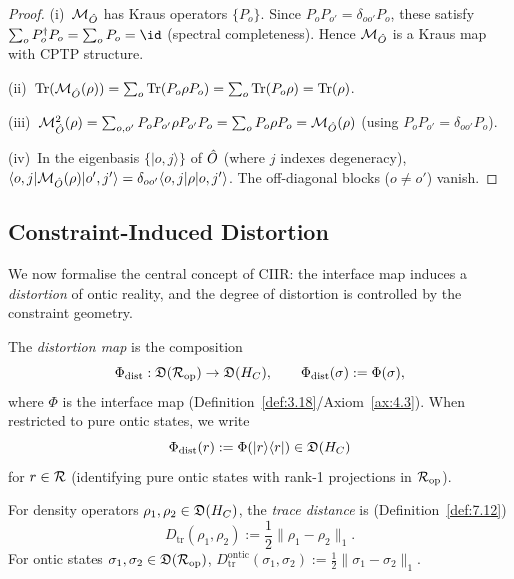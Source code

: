 \begin{proof}
(i)~$\mathcal{M}_{\hat{O}}$ has Kraus operators $\{P_o\}$.  Since
$P_o P_{o'} = \delta_{oo'} P_o$, these satisfy $\sum_o P_o^\dagger
P_o = \sum_o P_o = \id$ (spectral completeness).  Hence
$\mathcal{M}_{\hat{O}}$ is a Kraus map with CPTP structure.

(ii)~$\mathrm{Tr}(\mathcal{M}_{\hat{O}}(\rho)) = \sum_o \mathrm{Tr}(P_o\rho P_o)
= \sum_o \mathrm{Tr}(P_o\rho) = \mathrm{Tr}(\rho)$.

(iii)~$\mathcal{M}_{\hat{O}}^2(\rho) = \sum_{o,o'} P_o P_{o'}\rho
P_{o'} P_o = \sum_o P_o\rho P_o = \mathcal{M}_{\hat{O}}(\rho)$
(using $P_o P_{o'} = \delta_{oo'} P_o$).

(iv)~In the eigenbasis $\{|o,j\rangle\}$ of $\hat{O}$ (where $j$ indexes
degeneracy), $\langle o,j|\mathcal{M}_{\hat{O}}(\rho)|o',j'\rangle
= \delta_{oo'}\langle o,j|\rho|o,j'\rangle$.  The off-diagonal blocks
($o \neq o'$) vanish.
\end{proof}

\subsection{Constraint-Induced Distortion}
\label{sec:ch8:distortion}

We now formalise the central concept of CIIR: the interface map
induces a \emph{distortion} of ontic reality, and the degree of
distortion is controlled by the constraint geometry.

\begin{definition}
\label{def:8.9}
The \emph{distortion map} is the composition
\[
  \Phi_{\mathrm{dist}} : \mathfrak{D}(\mathcal{R}_{\mathrm{op}}) \to
  \mathfrak{D}(H_C),
  \qquad
  \Phi_{\mathrm{dist}}(\sigma) := \Phi(\sigma),
\]
where $\Phi$ is the interface map
(Definition~\ref{def:3.18}/Axiom~\ref{ax:4.3}).  When restricted to
pure ontic states, we write
\[
  \Phi_{\mathrm{dist}}(r) := \Phi(|r\rangle\langle r|)
  \in \mathfrak{D}(H_C)
\]
for $r \in \mathcal{R}$ (identifying pure ontic states with rank-1 projections
in $\mathcal{R}_{\mathrm{op}}$).
\end{definition}

\begin{definition}
\label{def:8.10}
For density operators $\rho_1, \rho_2 \in \mathfrak{D}(H_C)$, the
\emph{trace distance} is (Definition~\ref{def:7.12})
\[
  D_{\mathrm{tr}}(\rho_1, \rho_2)
  := \frac{1}{2}\|\rho_1 - \rho_2\|_1.
\]
For ontic states $\sigma_1, \sigma_2 \in \mathfrak{D}(\mathcal{R}_{\mathrm{op}})$,
$D_{\mathrm{tr}}^{\mathrm{ontic}}(\sigma_1, \sigma_2)
:= \frac{1}{2}\|\sigma_1 - \sigma_2\|_1$.
\end{definition}

